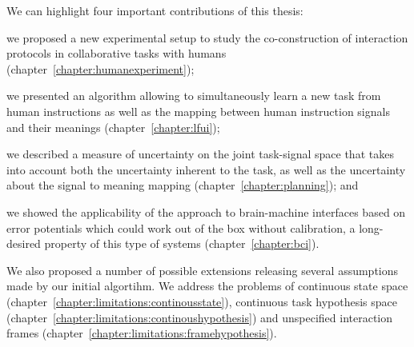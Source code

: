 We can highlight four important contributions of this thesis: \begin{inparaenum}[(1)] \item we proposed a new experimental setup to study the co-construction of interaction protocols in collaborative tasks with humans (chapter~\ref{chapter:humanexperiment}); \item we presented an algorithm allowing to simultaneously learn a new task from human instructions as well as the mapping between human instruction signals and their meanings (chapter~\ref{chapter:lfui}); \item we described a measure of uncertainty on the joint task-signal space that takes into account both the uncertainty inherent to the task, as well as the uncertainty about the signal to meaning mapping (chapter~\ref{chapter:planning}); and \item we showed the applicability of the approach to brain-machine interfaces based on error potentials which could work out of the box without calibration, a long-desired property of this type of systems (chapter~\ref{chapter:bci}). \end{inparaenum}

We also proposed a number of possible extensions releasing several assumptions made by our initial algortihm. We address the problems of continuous state space (chapter~\ref{chapter:limitations:continousstate}), continuous task hypothesis space (chapter~\ref{chapter:limitations:continoushypothesis}) and unspecified interaction frames (chapter~\ref{chapter:limitations:framehypothesis}). 




